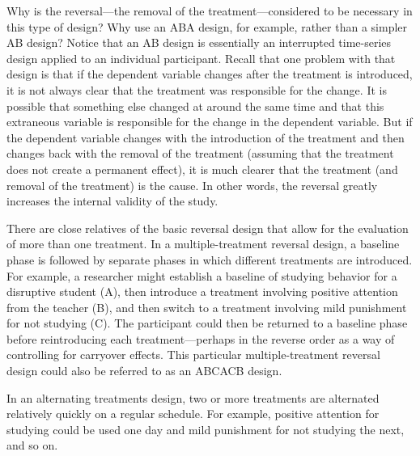 Why is the reversal---the removal of the treatment---considered to be necessary in this type of design? Why use an ABA design, for example, rather than a simpler AB design? Notice that an AB design is essentially an interrupted time-series design applied to an individual participant. Recall that one problem with that design is that if the dependent variable changes after the treatment is introduced, it is not always clear that the treatment was responsible for the change. It is possible that something else changed at around the same time and that this extraneous variable is responsible for the change in the dependent variable. But if the dependent variable changes with the introduction of the treatment and then changes back with the removal of the treatment (assuming that the treatment does not create a permanent effect), it is much clearer that the treatment (and removal of the treatment) is the cause. In other words, the reversal greatly increases the internal validity of the study.

There are close relatives of the basic reversal design that allow for the evaluation of more than one treatment. In a multiple-treatment reversal design, a baseline phase is followed by separate phases in which different treatments are introduced. For example, a researcher might establish a baseline of studying behavior for a disruptive student (A), then introduce a treatment involving positive attention from the teacher (B), and then switch to a treatment involving mild punishment for not studying (C). The participant could then be returned to a baseline phase before reintroducing each treatment---perhaps in the reverse order as a way of controlling for carryover effects. This particular multiple-treatment reversal design could also be referred to as an ABCACB design.

In an alternating treatments design, two or more treatments are alternated relatively quickly on a regular schedule. For example, positive attention for studying could be used one day and mild punishment for not studying the next, and so on. 


